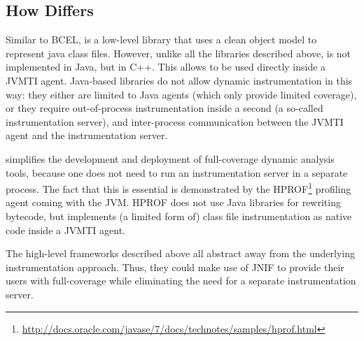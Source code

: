 \subsection*{How \jnif{} Differs}

Similar to BCEL, \jnif{} is a low-level library that uses a clean object model to represent java class files.
However, unlike all the libraries described above,
\jnif{} is not implemented in Java, but in C++.
This allows \jnif{} to be used directly inside a JVMTI agent. 
Java-based libraries do not allow dynamic instrumentation in this way:
they either are limited to Java agents (which only provide limited coverage),
or they require out-of-process instrumentation inside a second \jvm{} (a so-called instrumentation server),
and inter-process communication between the JVMTI agent and the instrumentation server.

\jnif{} simplifies the development and deployment of full-coverage dynamic analysis tools,
because one does not need to run an instrumentation server in a separate \jvm{} process.
The fact that this is essential is demonstrated by the HPROF\footnote{\url{http://docs.oracle.com/javase/7/docs/technotes/samples/hprof.html}} profiling agent coming with the JVM.
HPROF does not use Java libraries for rewriting bytecode,
but implements (a limited form of) class file instrumentation as native code inside a JVMTI agent.

The high-level frameworks described above all abstract away from the underlying instrumentation approach.
Thus, they could make use of JNIF to provide their users with full-coverage 
while eliminating the need for a separate instrumentation server.
